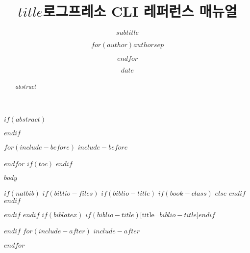 \documentclass[$if(fontsize)$$fontsize$,$endif$$if(lang)$$lang$,$endif$$if(papersize)$$papersize$,$endif$$for(classoption)$$classoption$$sep$,$endfor$]{$documentclass$}
\title{$title$}
\subtitle{$subtitle$}
\author{$for(author)$$author$$sep$ \and $endfor$}
\date{$date$}
\begin{document}
\title{로그프레소 CLI 레퍼런스 매뉴얼}
\maketitle

$if(abstract)$
\begin{abstract}
$abstract$
\end{abstract}
$endif$

$for(include-before)$
$include-before$

$endfor$
$if(toc)$
{
\def\contentsname{목차}
\hypersetup{linkcolor=black}
\setcounter{tocdepth}{$toc-depth$}
\tableofcontents
\newpage
}
$endif$

\def\figurename{그림}

$body$

$if(natbib)$
$if(biblio-files)$
$if(biblio-title)$
$if(book-class)$
\renewcommand\bibname{$biblio-title$}
$else$
\renewcommand\refname{$biblio-title$}
$endif$
$endif$


$endif$
$endif$
$if(biblatex)$
\printbibliography$if(biblio-title)$[title=$biblio-title$]$endif$

$endif$
$for(include-after)$
$include-after$

$endfor$
\end{document}
